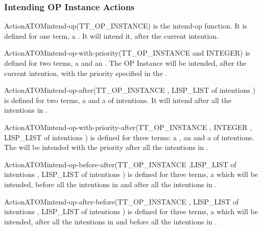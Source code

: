 \subsubsection{Intending OP Instance Actions}

\begin{typeefa}{Action}{ATOM}{intend-op}{(TT\_OP\_INSTANCE)}
is the intend-op function. It is defined for one term, a . It will intend it, after the current intention.
\end{typeefa}

\begin{typeefa}{Action}{ATOM}{intend-op-with-priority}{(TT\_OP\_INSTANCE and INTEGER)}
is defined for two terms, a  and an . The OP
Instance will be intended, after the current intention, with the priority
specified in the .
\end{typeefa}

\begin{typeefa}{Action}{ATOM}{intend-op-after}{(TT\_OP\_INSTANCE , LISP\_LIST of intentions )}
is defined for two terms, a  and a  of
intentions. It will intend  after all the intentions in
.
\end{typeefa}

\begin{typeefa}{Action}{ATOM}{intend-op-with-priority-after}{(TT\_OP\_INSTANCE , INTEGER , LISP\_LIST of intentions )}
is defined for three terms;  a ,
 an  and  a   of intentions. The
 will be  intended with the priority  after all the
intentions in .
\end{typeefa}

\begin{typeefa}{Action}{ATOM}{intend-op-before-after}{(TT\_OP\_INSTANCE ,LISP\_LIST of intentions , LISP\_LIST of intentions )}
is defined for three terms, a   which will be
intended, before all the intentions in  and after all the
intentions in .
\end{typeefa}

\begin{typeefa}{Action}{ATOM}{intend-op-after-before}{(TT\_OP\_INSTANCE , LISP\_LIST of intentions , LISP\_LIST of intentions )}
is defined for three terms, a   which will be
intended, after all the intentions in  and before all the intentions
in .
\end{typeefa}

